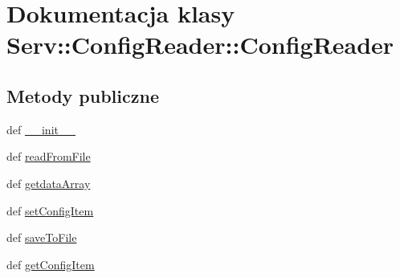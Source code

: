 \hypertarget{class_serv_1_1_config_reader_1_1_config_reader}{
\section{Dokumentacja klasy Serv::ConfigReader::ConfigReader}
\label{class_serv_1_1_config_reader_1_1_config_reader}
}
\subsection*{Metody publiczne}
\begin{CompactItemize}
\item 
def \hyperlink{class_serv_1_1_config_reader_1_1_config_reader_79fcc0800606aaab1c5b4b0f2910b821}{\_\-\_\-init\_\-\_\-}
\item 
def \hyperlink{class_serv_1_1_config_reader_1_1_config_reader_c8ff5305639fac5691feb7de4ae9ceea}{readFromFile}
\item 
def \hyperlink{class_serv_1_1_config_reader_1_1_config_reader_6a032fedc46e0b5557d1124aeb5fc996}{getdataArray}
\item 
def \hyperlink{class_serv_1_1_config_reader_1_1_config_reader_44baeb28dc94ccbc797ab1164d98fa04}{setConfigItem}
\item 
def \hyperlink{class_serv_1_1_config_reader_1_1_config_reader_919cf4af7c9d0eb3a91ef578731edb0a}{saveToFile}
\item 
def \hyperlink{class_serv_1_1_config_reader_1_1_config_reader_9679117d87cde62fd4243670089a11cc}{getConfigItem}
\end{CompactItemize}
